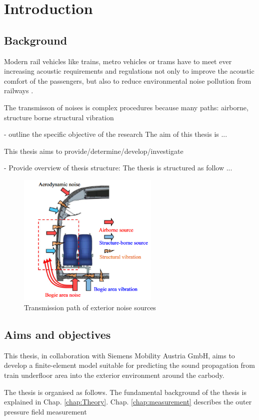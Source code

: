 \chapter{Introduction}
\label{chap:Introduction}

\section{Background}

Modern rail vehicles like trains, metro vehicles or trams have to meet ever increasing acoustic requirements and regulations not only to improve the acoustic comfort of the passengers, but also to reduce environmental noise pollution from railways \cite{paozalyte_pollution_2011, li_25d_2021, zhang_sound_2019}.

The transmisson of noises is complex procedures because many paths: airborne, structure borne structural vibration


- outline the specific objective of the research
The aim of this thesis is ...

This thesis aims to provide/determine/develop/investigate

- Provide overview of thesis structure:
The thesis is structured as follow ...


\begin{figure}[H]
    \centering
    \includegraphics[width=0.6\textwidth]{fig/noise_transmission_path.png}
    \caption{Transmission path of exterior noise sources \cite{zhang_sound_2019}}
    \label{fig:my_label}
\end{figure}

\newpage
\section{Aims and objectives}

This thesis, in collaboration with Siemens Mobility Austria GmbH, aims to develop a finite-element model suitable for predicting the sound propagation from train underfloor area into the exterior environment around the carbody. 


The thesis is organised as follows. The fundamental background of the thesis is explained in Chap. \ref{chap:Theory}. Chap. \ref{chap:measurement} describes the outer pressure field measurement